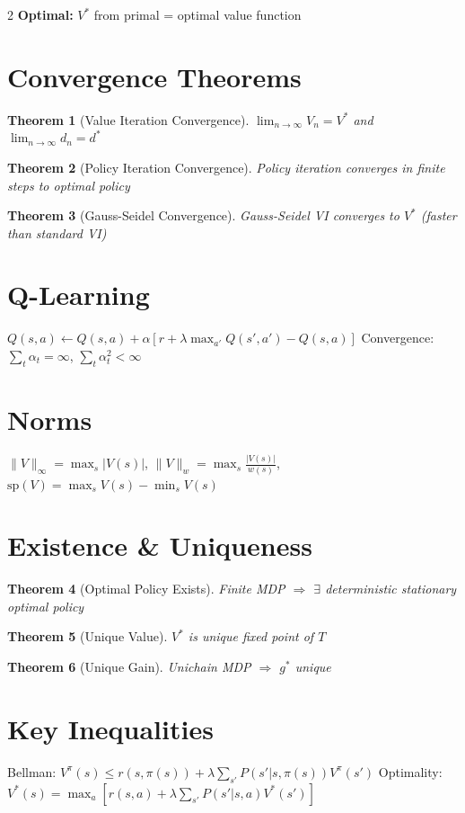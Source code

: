 \documentclass[8pt]{extarticle}
\newtheorem{theorem}{Theorem}
\begin{document}
\begin{multicols}{2}
\textbf{Optimal:} $V^*$ from primal = optimal value function

\section*{\textcolor{theoremblue}{Convergence Theorems}}
\begin{theorem}[Value Iteration Convergence]
$\lim_{n \to \infty} V_n = V^*$ and $\lim_{n \to \infty} d_n = d^*$
\end{theorem}

\begin{theorem}[Policy Iteration Convergence]
Policy iteration converges in finite steps to optimal policy
\end{theorem}

\begin{theorem}[Gauss-Seidel Convergence]
Gauss-Seidel VI converges to $V^*$ (faster than standard VI)
\end{theorem}

\section*{\textcolor{algorithmgreen}{Q-Learning}}
$Q(s,a) \leftarrow Q(s,a) + \alpha [r + \lambda \max_{a'} Q(s',a') - Q(s,a)]$
Convergence: $\sum_t \alpha_t = \infty$, $\sum_t \alpha_t^2 < \infty$

\section*{\textcolor{formulared}{Norms}}
$\|V\|_\infty = \max_s |V(s)|$, $\|V\|_w = \max_s \frac{|V(s)|}{w(s)}$, $\text{sp}(V) = \max_s V(s) - \min_s V(s)$

\section*{\textcolor{theoremblue}{Existence \& Uniqueness}}
\begin{theorem}[Optimal Policy Exists]
Finite MDP $\Rightarrow$ $\exists$ deterministic stationary optimal policy
\end{theorem}
\begin{theorem}[Unique Value]
$V^*$ is unique fixed point of $T$
\end{theorem}
\begin{theorem}[Unique Gain]
Unichain MDP $\Rightarrow$ $g^*$ unique
\end{theorem}

\section*{\textcolor{proofpurple}{Key Inequalities}}
Bellman: $V^\pi(s) \leq r(s,\pi(s)) + \lambda \sum_{s'} P(s'|s,\pi(s)) V^\pi(s')$
Optimality: $V^*(s) = \max_a [r(s,a) + \lambda \sum_{s'} P(s'|s,a) V^*(s')]$


\end{multicols}
\end{document}
